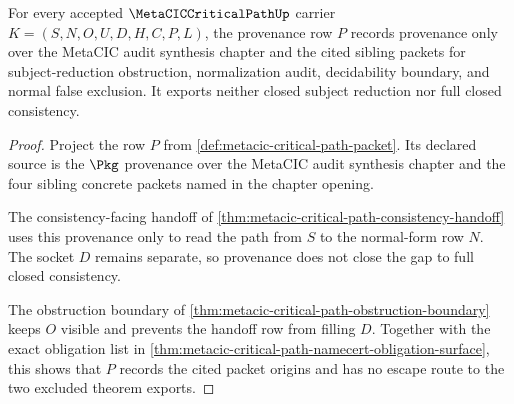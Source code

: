 \begin{theorem}
\label{thm:metacic-critical-path-provenance-nonescape}
For every accepted $\MetaCICCriticalPathUp$ carrier $K=(S,N,O,U,D,H,C,P,L)$, the provenance row $P$ records provenance only over the MetaCIC audit synthesis chapter and the cited sibling packets for subject-reduction obstruction, normalization audit, decidability boundary, and normal false exclusion. It exports neither closed subject reduction nor full closed consistency.
\end{theorem}
\begin{proof}
Project the row $P$ from \autoref{def:metacic-critical-path-packet}. Its declared source is the $\Pkg$ provenance over the MetaCIC audit synthesis chapter and the four sibling concrete packets named in the chapter opening.

The consistency-facing handoff of \autoref{thm:metacic-critical-path-consistency-handoff} uses this provenance only to read the path from $S$ to the normal-form row $N$. The socket $D$ remains separate, so provenance does not close the gap to full closed consistency.

The obstruction boundary of \autoref{thm:metacic-critical-path-obstruction-boundary} keeps $O$ visible and prevents the handoff row from filling $D$. Together with the exact obligation list in \autoref{thm:metacic-critical-path-namecert-obligation-surface}, this shows that $P$ records the cited packet origins and has no escape route to the two excluded theorem exports.
\end{proof}

